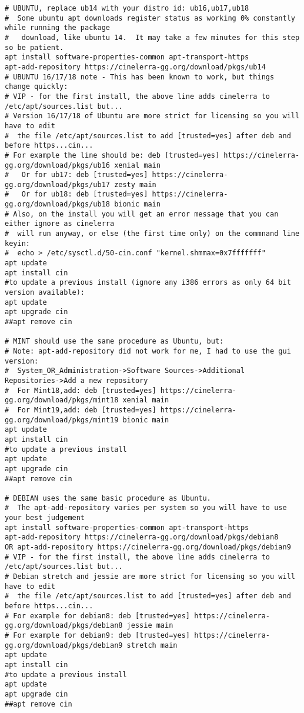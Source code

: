 \begin{lstlisting}
# UBUNTU, replace ub14 with your distro id: ub16,ub17,ub18
#  Some ubuntu apt downloads register status as working 0% constantly while running the package
#   download, like ubuntu 14.  It may take a few minutes for this step so be patient.
apt install software-properties-common apt-transport-https
apt-add-repository https://cinelerra-gg.org/download/pkgs/ub14
# UBUNTU 16/17/18 note - This has been known to work, but things change quickly:
# VIP - for the first install, the above line adds cinelerra to /etc/apt/sources.list but...
# Version 16/17/18 of Ubuntu are more strict for licensing so you will have to edit
#  the file /etc/apt/sources.list to add [trusted=yes] after deb and before https...cin...
# For example the line should be: deb [trusted=yes] https://cinelerra-gg.org/download/pkgs/ub16 xenial main
#   Or for ub17: deb [trusted=yes] https://cinelerra-gg.org/download/pkgs/ub17 zesty main
#   Or for ub18: deb [trusted=yes] https://cinelerra-gg.org/download/pkgs/ub18 bionic main
# Also, on the install you will get an error message that you can either ignore as cinelerra
#  will run anyway, or else (the first time only) on the commnand line keyin: 
#  echo > /etc/sysctl.d/50-cin.conf "kernel.shmmax=0x7fffffff"
apt update
apt install cin
#to update a previous install (ignore any i386 errors as only 64 bit version available):
apt update
apt upgrade cin
##apt remove cin

# MINT should use the same procedure as Ubuntu, but: 
# Note: apt-add-repository did not work for me, I had to use the gui version:
#  System_OR_Administration->Software Sources->Additional Repositories->Add a new repository
#  For Mint18,add: deb [trusted=yes] https://cinelerra-gg.org/download/pkgs/mint18 xenial main
#  For Mint19,add: deb [trusted=yes] https://cinelerra-gg.org/download/pkgs/mint19 bionic main 
apt update
apt install cin
#to update a previous install
apt update
apt upgrade cin
##apt remove cin

# DEBIAN uses the same basic procedure as Ubuntu.
#  The apt-add-repository varies per system so you will have to use your best judgement
apt install software-properties-common apt-transport-https
apt-add-repository https://cinelerra-gg.org/download/pkgs/debian8
OR apt-add-repository https://cinelerra-gg.org/download/pkgs/debian9
# VIP - for the first install, the above line adds cinelerra to /etc/apt/sources.list but...
# Debian stretch and jessie are more strict for licensing so you will have to edit
#  the file /etc/apt/sources.list to add [trusted=yes] after deb and before https...cin...
# For example for debian8: deb [trusted=yes] https://cinelerra-gg.org/download/pkgs/debian8 jessie main
# For example for debian9: deb [trusted=yes] https://cinelerra-gg.org/download/pkgs/debian9 stretch main
apt update
apt install cin
#to update a previous install
apt update
apt upgrade cin
##apt remove cin


\end{lstlisting}
